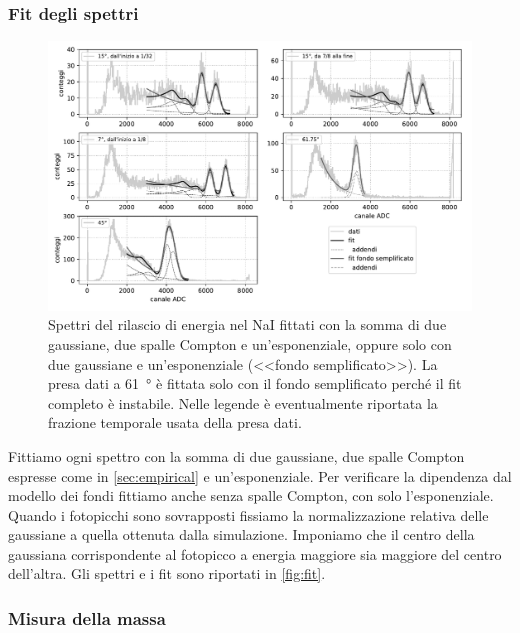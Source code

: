 \subsubsection{Fit degli spettri}

\begin{figure}
	\hspace{-8em}\includegraphics[height=0.9\textwidth]{fit}
	\caption{\label{fig:fit}
	Spettri del rilascio di energia nel NaI
	fittati con la somma di due gaussiane, due spalle Compton e un'esponenziale,
	oppure solo con due gaussiane e un'esponenziale (<<fondo semplificato>>).
	La presa dati a \SI{61}{\degree} è fittata solo con il fondo semplificato
	perché il fit completo è instabile.
	Nelle legende è eventualmente riportata
	la frazione temporale usata della presa dati.}
\end{figure}

Fittiamo ogni spettro con la somma di due gaussiane,
due spalle Compton espresse come in \autoref{sec:empirical}
e un'esponenziale.
Per verificare la dipendenza dal modello dei fondi
fittiamo anche senza spalle Compton, con solo l'esponenziale.
Quando i fotopicchi sono sovrapposti
fissiamo la normalizzazione relativa delle gaussiane a quella ottenuta dalla simulazione.
Imponiamo che il centro della gaussiana corrispondente al fotopicco a energia maggiore
sia maggiore del centro dell'altra.
Gli spettri e i fit sono riportati in \autoref{fig:fit}.

\subsubsection{Misura della massa}

